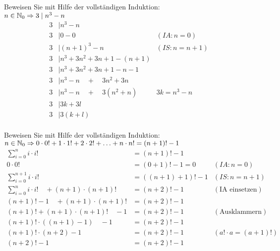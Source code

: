 \begin{card}
  Beweisen Sie mit Hilfe der vollständigen Induktion:\\
  $n \in \mathbb{N}_0 \Rightarrow 3 \mid n^3 - n$
  \hr
  \begin{align*}
    3 &\mid n^3 - n & \\
    3 &\mid 0 - 0 & (IA: n=0) \\
    3 &\mid (n+1)^3 - n & (IS: n=n+1) \\
    3 &\mid n^3 + 3n^2 + 3n + 1 - (n+1) & \\
    3 &\mid n^3 + 3n^2 + 3n + 1 - n - 1 & \\
    3 &\mid n^3 - n \quad + \quad 3n^2 + 3n & \\
    3 &\mid n^3 - n \quad + \quad 3(n^2 + n) & 3k = n^3 - n \\
    3 &\mid 3k + 3l & \\
    3 &\mid 3(k + l) & \\
  \end{align*}
\end{card}

\begin{card}
  Beweisen Sie mit Hilfe der vollständigen Induktion:\\
  $n \in \mathbb{N}_0 \Rightarrow 0 \cdot 0! + 1 \cdot 1! + 2 \cdot 2! + \ldots + n \cdot n! = (n+1)!-1$
  \hr
  \begin{align*}
    \sum\limits_{i=0}^{n} i \cdot i! &= (n+1)!-1 & \\
    0 \cdot 0! &= (0+1)!-1 = 0 & (IA: n=0) \\
    \sum\limits_{i=0}^{n+1} i \cdot i! &= ((n+1)+1)!-1 & (IS: n=n+1) \\
    \sum\limits_{i=0}^{n} i \cdot i! \quad + (n+1) \cdot (n+1)! &= (n+2)!-1 &  (\text{IA einsetzen})\\
    (n+1)! - 1 \quad + (n+1) \cdot (n+1)! &= (n+2)!-1 & \\
    (n+1)! + (n+1) \cdot (n+1)! \quad -1&= (n+2)!-1 & (\text{Ausklammern})\\
    (n+1)! \cdot ((n+1) -1) \quad -1&= (n+2)!-1 & \\
    (n+1)! \cdot (n+2) -1&= (n+2)!-1 & (a! \cdot a = (a+1)!)\\
    (n+2)! -1&= (n+2)!-1 & \\
  \end{align*}
\end{card}

